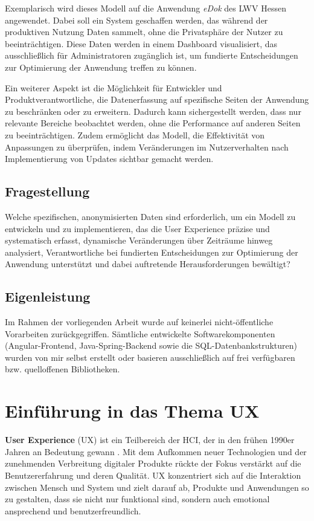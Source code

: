 \documentclass[12pt,oneside]{article}
\begin{document}
Exemplarisch wird dieses Modell auf die Anwendung \textit{eDok} des LWV Hessen angewendet. Dabei soll ein System geschaffen werden, das während der produktiven Nutzung Daten sammelt, ohne die Privatsphäre der Nutzer zu beeinträchtigen. Diese Daten werden in einem Dashboard visualisiert, das ausschließlich für Administratoren zugänglich ist, um fundierte Entscheidungen zur Optimierung der Anwendung treffen zu können.

Ein weiterer Aspekt ist die Möglichkeit für Entwickler und Produktverantwortliche, die Datenerfassung auf spezifische Seiten der Anwendung zu beschränken oder zu erweitern. Dadurch kann sichergestellt werden, dass nur relevante Bereiche beobachtet werden, ohne die Performance auf anderen Seiten zu beeinträchtigen. Zudem ermöglicht das Modell, die Effektivität von Anpassungen zu überprüfen, indem Veränderungen im Nutzerverhalten nach Implementierung von Updates sichtbar gemacht werden.

\subsection{Fragestellung}

Welche spezifischen, anonymisierten Daten sind erforderlich, um ein Modell zu entwickeln und zu implementieren, das die User Experience präzise und systematisch erfasst, dynamische Veränderungen über Zeiträume hinweg analysiert, Verantwortliche bei fundierten Entscheidungen zur Optimierung der Anwendung unterstützt und dabei auftretende Herausforderungen bewältigt?
\subsection{Eigenleistung}
Im Rahmen der vorliegenden Arbeit wurde auf keinerlei nicht-öffentliche Vorarbeiten zurückgegriffen. Sämtliche entwickelte Softwarekomponenten (Angular-Frontend, Java-Spring-Backend sowie die SQL-Datenbankstrukturen) wurden von mir selbst erstellt oder basieren ausschließlich auf frei verfügbaren bzw. quelloffenen Bibliotheken.

\section{Einführung in das Thema UX}

\textbf{User Experience} (UX) ist ein Teilbereich der HCI, der in den frühen 1990er Jahren an Bedeutung gewann \cite{glanznig}. Mit dem Aufkommen neuer Technologien und der zunehmenden Verbreitung digitaler Produkte rückte der Fokus verstärkt auf die Benutzererfahrung und deren Qualität. UX konzentriert sich auf die Interaktion zwischen Mensch und System und zielt darauf ab, Produkte und Anwendungen so zu gestalten, dass sie nicht nur funktional sind, sondern auch emotional ansprechend und benutzerfreundlich.
\end{document}
